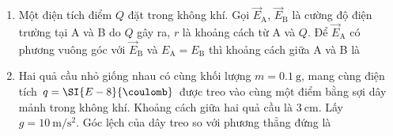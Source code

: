 \begin{enumerate}[label=\bfseries Câu \arabic*:]
\item Một điện tích điểm $Q$ đặt trong không khí. Gọi $\vec{E}_\text{A}$, $\vec{E}_\text{B}$ là cường độ điện trường tại A và B do $Q$ gây ra, $r$ là khoảng cách từ A và $Q$. Để $\vec{E}_\text{A}$ có phương vuông góc với $\vec{E}_\text{B}$ và $E_\text{A}=E_\text{B}$ thì khoảng cách giữa A và B là

\item Hai quả cầu nhỏ giống nhau có cùng khối lượng $m=\SI{0.1}{\gram}$, mang cùng điện tích $q=\SI{E-8}{\coulomb}$ được treo vào cùng một điểm bằng sợi dây mảnh trong không khí. Khoảng cách giữa hai quả cầu là $\SI{3}{\centi\meter}$. Lấy $g=\SI{10}{\meter/\second^2}$. Góc lệch của dây treo so với phương thẳng đứng là


\end{enumerate}
